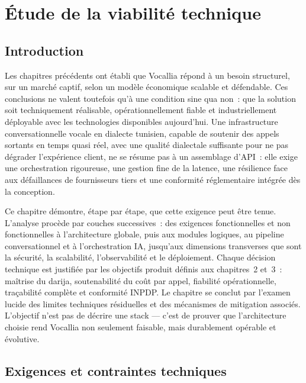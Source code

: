 \chapter{Étude de la viabilité technique}
\label{Chapitre_4}
\section{Introduction}
\label{sec:intro_chap4}

Les chapitres précédents ont établi que Vocallia répond à un besoin structurel, sur un marché captif, selon un modèle économique scalable et défendable. Ces conclusions ne valent toutefois qu'à une condition sine qua non~: que la solution soit techniquement réalisable, opérationnellement fiable et industriellement déployable avec les technologies disponibles aujourd'hui. Une infrastructure conversationnelle vocale en dialecte tunisien, capable de soutenir des appels sortants en temps quasi réel, avec une qualité dialectale suffisante pour ne pas dégrader l'expérience client, ne se résume pas à un assemblage d'API~: elle exige une orchestration rigoureuse, une gestion fine de la latence, une résilience face aux défaillances de fournisseurs tiers et une conformité réglementaire intégrée dès la conception.

Ce chapitre démontre, étape par étape, que cette exigence peut être tenue. L'analyse procède par couches successives~: des exigences fonctionnelles et non fonctionnelles à l'architecture globale, puis aux modules logiques, au pipeline conversationnel et à l'orchestration IA, jusqu'aux dimensions transverses que sont la sécurité, la scalabilité, l'observabilité et le déploiement. Chaque décision technique est justifiée par les objectifs produit définis aux chapitres~2 et~3~: maîtrise du darija, soutenabilité du coût par appel, fiabilité opérationnelle, traçabilité complète et conformité INPDP. Le chapitre se conclut par l'examen lucide des limites techniques résiduelles et des mécanismes de mitigation associés. L'objectif n'est pas de décrire une stack — c'est de prouver que l'architecture choisie rend Vocallia non seulement faisable, mais durablement opérable et évolutive.

\section{Exigences et contraintes techniques}
\label{sec:exigences_techniques}

